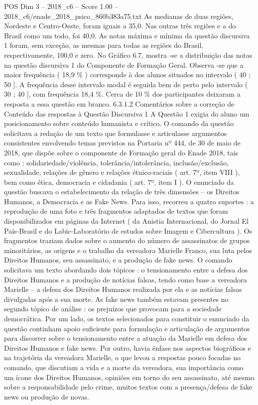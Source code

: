 \begin{textsample}{POS Dim 3 – 2018\_c6 – Score 1.00 – 2018\_c6/enade\_2018\_psico\_860b383a75.txt}
As medianas de duas regiões, Nordeste e Centro-Oeste, foram iguais a 35,0.
Nas outras três regiões e a do Brasil como um todo, foi 40,0.
As notas máxima e mínima da questão discursiva 1 foram, sem exceção, as mesmas para todas as regiões do Brasil, respectivamente, 100,0 e zero.
No Gráfico 6.7, mostra -se a distribuição das notas na questão discursiva 1 do Componente de Formação Geral.
Observa -se que a maior frequência ( 18,9 \% ) corresponde à dos alunos situados no intervalo ( 40 ; 50 ].
A frequência desse intervalo modal é seguida bem de perto pelo intervalo ( 30 ; 40 ], com frequência 18,4 \%.
Cerca de 10 \% dos participantes deixaram a resposta a essa questão em branco. 6.3.1.2 Comentários sobre a correção de Conteúdo das respostas à Questão Discursiva 1 A Questão 1 exigia do aluno um posicionamento sobre conteúdo humanista e crítico.
O comando da questão solicitava a redação de um texto que formulasse e articulasse argumentos consistentes envolvendo temas previstos na Portaria nº 444, de 30 de maio de 2018, que dispõe sobre o componente de Formação geral do Enade 2018, tais como : solidariedade/violência, tolerância/intolerância, inclusão/exclusão, sexualidade, relações de gênero e relações étnico-raciais ( art. 7º, item VIII ), bem como ética, democracia e cidadania ( art. 7º, item I ).
O enunciado da questão buscava o estabelecimento da relação de três dimensões – os Direitos Humanos, a Democracia e as Fake News.
Para isso, recorreu a quatro suportes : a reprodução de uma foto e três fragmentos adaptados de textos que foram disponibilizados em páginas da Internet ( da Anistia Internacional, do Jornal El País-Brasil e do Labic-Laboratório de estudos sobre Imagem e Cibercultura ).
Os fragmentos traziam dados sobre o aumento do número de assassinatos de grupos minoritários, as origens e o trabalho da vereadora Marielle Franco, sua luta pelos Direitos Humanos, seu assassinato, e a produção de fake news.
O comando solicitava um texto abordando dois tópicos : o tensionamento entre a defesa dos Direitos Humanos e a produção de notícias falsas, tendo como base a vereadora Marielle – a defesa dos Direitos Humanos realizada por ela e as notícias falsas divulgadas após a sua morte.
As fake news também estavam presentes no segundo tópico de análise : os prejuízos que provocam para a sociedade democrática.
Por um lado, os textos selecionados para constituir o enunciado da questão continham apoio suficiente para formulação e articulação de argumentos para discorrer sobre o tensionamento entre a atuação da Marielle em defesa dos Direitos Humanos e fake news.
Por outro, havia ênfase nos aspectos biográficos e na trajetória da vereadora Marielle, o que levou a respostas pouco focadas no comando, que discutiam a vida e a morte da vereadora, sua importância como um ícone dos Direitos Humanos, opiniões em torno do seu assassinato, até mesmo sobre a responsabilidade pelo crime, muitos textos com a presença/defesa de fake news ou produção de novas.

\end{textsample}
